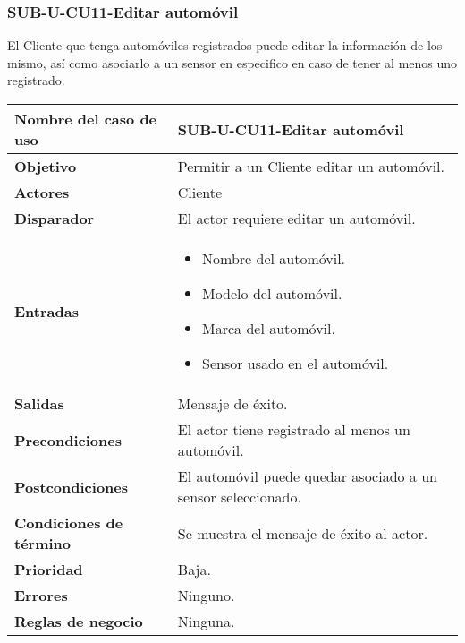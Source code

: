 \subsubsection{SUB-U-CU11-Editar automóvil}\label{SUB-U-CU11}
El Cliente que tenga automóviles registrados puede editar la información de los mismo, así como asociarlo a un sensor en especifico en caso de tener al menos uno registrado.

\begin{longtable}{|J{5cm}|J{10.3cm}|}
	\hline
	\textbf{Nombre del caso de uso} &
		SUB-U-CU11-Editar automóvil \\ \hline
	\textbf{Objetivo} &
		Permitir a un Cliente editar un automóvil. \\ \hline
	\textbf{Actores} &
		Cliente \\ \hline 
	\textbf{Disparador} & 
		El actor requiere editar un automóvil. \\ \hline 
	\textbf{Entradas} & 
		\begin{itemize}
				\item Nombre del automóvil.
				\item Modelo del automóvil.
				\item Marca del automóvil.
				\item Sensor usado en el automóvil.
		\end{itemize}\\ \hline 
	\textbf{Salidas} & Mensaje de éxito.
		\\ \hline
	\textbf{Precondiciones} & El actor tiene registrado al menos un automóvil.
		\\ \hline
	\textbf{Postcondiciones} & El automóvil puede quedar asociado a un sensor seleccionado.
		\\ \hline
	\textbf{Condiciones de término} & Se muestra el mensaje de éxito al actor.
		\\ \hline 
	\textbf{Prioridad} & 
		Baja. \\ \hline
	\textbf{Errores} & Ninguno.
		\\ \hline
	\textbf{Reglas de negocio} & Ninguna.
		 \\ \hline
\end{longtable}

